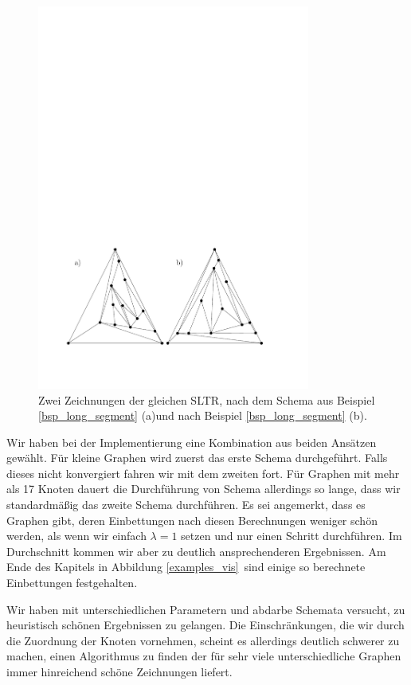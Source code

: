 \begin{figure}
	\centering
  \includegraphics[width=0.8\textwidth]{ex_large_corner.pdf}
  \caption{Zwei Zeichnungen der gleichen SLTR, nach dem Schema aus Beispiel \ref{bsp_long_segment} (a)und nach Beispiel \ref{bsp_long_segment} (b).}
  \label{large_corner}
\end{figure}

Wir haben bei der Implementierung eine Kombination aus beiden Ansätzen gewählt. Für kleine Graphen wird zuerst das erste Schema durchgeführt. Falls dieses nicht konvergiert fahren wir mit dem zweiten fort. Für Graphen mit mehr als 17 Knoten dauert die Durchführung von Schema allerdings so lange, dass wir standardmäßig das zweite Schema durchführen. Es sei angemerkt, dass es Graphen gibt, deren Einbettungen nach diesen Berechnungen weniger schön werden, als wenn wir einfach $\lambda=1$ setzen und nur einen Schritt durchführen. Im Durchschnitt kommen wir aber zu deutlich ansprechenderen Ergebnissen. Am Ende des Kapitels in Abbildung \ref{examples_vis} sind einige so berechnete Einbettungen festgehalten.

\begin{remark}
Wir haben mit unterschiedlichen Parametern und abdarbe Schemata versucht, zu heuristisch schönen Ergebnissen zu gelangen. Die Einschränkungen, die wir durch die Zuordnung der Knoten vornehmen, scheint es allerdings deutlich schwerer zu machen, einen Algorithmus zu finden der für sehr viele unterschiedliche Graphen immer hinreichend schöne Zeichnungen liefert.
\end{remark}

